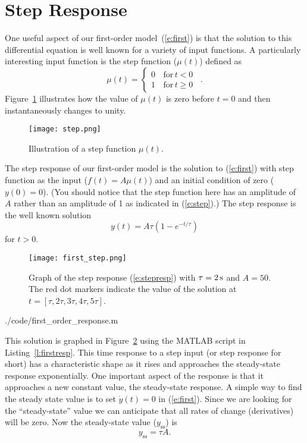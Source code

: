 \section{Step Response}\label{s:firststep}
One useful aspect of our first-order model~(\ref{e:first}) is that the solution to this differential equation is well known for a variety of input functions.  A particularly interesting input function is the \gls{step function} ($\mu(t)$) defined as
\begin{equation}
\label{e:step}
\mu(t)= \left\{ 
\begin{array}{cl}
0 & \, \mathrm{for}\, t < 0 \,\,\,\\
1 & \, \mathrm{for}\, t \geq 0
\end{array} \right.
.
\end{equation}
Figure~\ref{f:step} illustrates how the value of $\mu(t)$ is zero before $t=0$ and then instantaneously changes to unity.
\begin{figure}[hbt!]
\centering
\texttt{[image: step.png]}
\caption{Illustration of a step function $\mu(t)$.}
\label{f:step}
\end{figure}

The \gls{step response} of our first-order model is the solution to (\ref{e:first}) with step function as the input ($f(t)=A\mu(t)$) and an initial condition of zero ($y(0)=0$).  (You should notice that the step function here has an amplitude of $A$ rather than an amplitude of 1 as indicated in (\ref{e:step}).)  The step response is the well known solution
\begin{equation}\label{e:stepresp}
y(t) = A\tau\left(1-e^{-t/\tau}\right)
\end{equation}
for $t>0$.

\begin{figure}[hbt]
\centering
\texttt{[image: first\_step.png]}
\caption{Graph of the step response (\ref{e:stepresp}) with $\tau=\unit[2]{s}$ and $A=50$.  The red dot markers indicate the value of the solution at $t=[\tau,2\tau,3\tau,4\tau,5\tau]$. }
\label{f:firststep}
\end{figure}



{./code/first_order_response.m}


This solution is graphed in Figure~\ref{f:firststep} using the MATLAB script in Listing~\ref{l:firstresp}. This time response to a step input (or step response for short) has a characteristic shape as it rises and approaches the \gls{steady-state response} exponentially.  One important aspect of the response is that it approaches a new constant value, the steady-state response.  A simple way to find the steady state value is to set $\dot{y}(t)=0$ in (\ref{e:first}).  Since we are looking for the ``steady-state'' value we can anticipate that all rates of change (derivatives) will be zero.  Now the steady-state value ($y_{\mathrm{ss}}$) is 
\begin{equation}\label{e:ss}
y_{\mathrm{ss}} = \tau A.
\end{equation}

